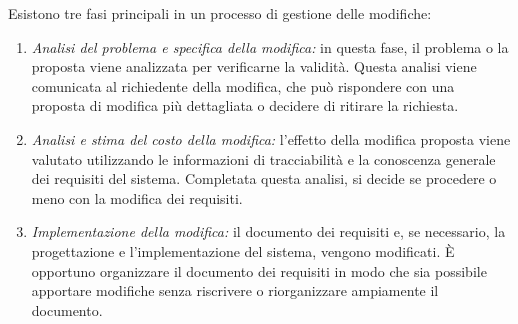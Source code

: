 Esistono tre fasi principali in un processo di gestione delle modifiche:
\begin{enumerate}
    \item \textit{Analisi del problema e specifica della modifica:} in questa fase, il problema o la proposta viene analizzata per verificarne la validità. Questa analisi viene comunicata al richiedente della modifica, che può rispondere con una proposta di modifica più dettagliata o decidere di ritirare la richiesta.
    \item \textit{Analisi e stima del costo della modifica:} l'effetto della modifica proposta viene valutato utilizzando le informazioni di tracciabilità e la conoscenza generale dei requisiti del sistema. Completata questa analisi, si decide se procedere o meno con la modifica dei requisiti.
    \item \textit{Implementazione della modifica:} il documento dei requisiti e, se necessario, la progettazione e l'implementazione del sistema, vengono modificati. È opportuno organizzare il documento dei requisiti in modo che sia possibile apportare modifiche senza riscrivere o riorganizzare ampiamente il documento.
\end{enumerate}

\newpage
